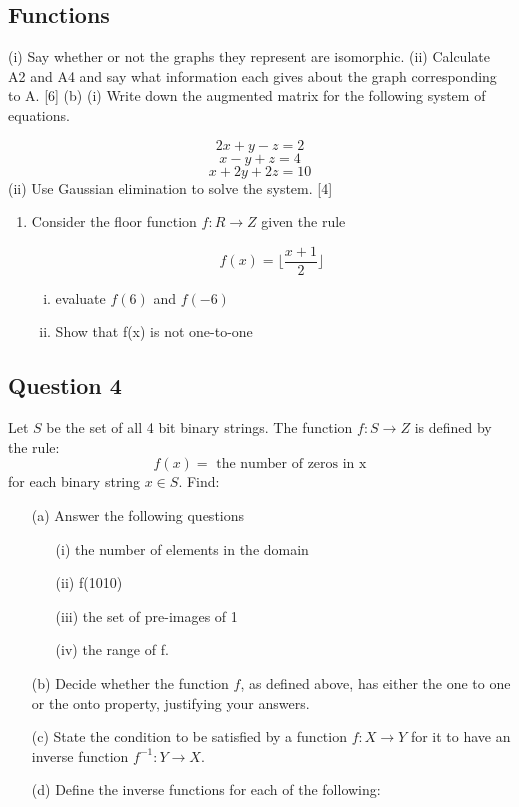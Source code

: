 \subsection{Functions}


(i) Say whether or not the graphs they represent are isomorphic.
(ii) Calculate A2 and A4 and say what information each gives about the graph
corresponding to A. [6]
(b) (i) Write down the augmented matrix for the following system of equations.

\[2x + y - z = 2\]
\[x - y + z = 4\]
\[x + 2y + 2z = 10\]
(ii) Use Gaussian elimination to solve the system. [4]


\begin{enumerate}


\item Consider the floor function $f : R \rightarrow Z$ given the rule

\[ f(x) = \lfloor \frac{x+1}{2} \rfloor \]

\begin{enumerate}[(i)]
\item evaluate $f(6)$ and $f(-6)$
\item Show that f(x) is not one-to-one
\end{enumerate}


\end{enumerate}



\subsection*{Question 4}
Let $S$ be the set of all 4 bit binary strings. The function $f : S \rightarrow Z$
is defined by the rule:
\[f(x) = \mbox{ the number of zeros in x} \] for each binary string $x \in S$.
Find:
\begin{itemize}
\item[(a)]  Answer the following questions
\begin{itemize}
\item[(i)] the number of elements in the domain
\item[(ii)] f(1010)
\item[(iii)] the set of pre-images of 1
\item[(iv)] the range of f. 
\end{itemize}
\item[(b)]  Decide whether the function $f$, as defined above, has either the one to one or
the onto property, justifying your answers. 
\item[(c)]  State the condition to be satisfied by a function $f : X \rightarrow Y$ for it to have an
inverse function $f^{-1} : Y \rightarrow X$.
\item[(d)]  Define the inverse functions for each of the following:
\end{itemize}

